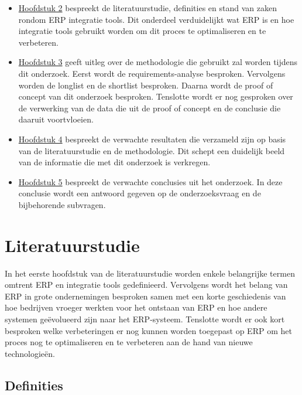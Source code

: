 \begin{itemize}
  \item \hyperref[sec:literatuurstudie]{Hoofdstuk 2} bespreekt de literatuurstudie, definities en stand van zaken rondom ERP integratie tools. Dit onderdeel verduidelijkt wat ERP is en hoe integratie tools gebruikt worden om dit proces te optimaliseren en te verbeteren.
  \item \hyperref[sec:methodologie]{Hoofdstuk 3} geeft uitleg over de methodologie die gebruikt zal worden tijdens dit onderzoek. Eerst wordt de requirements-analyse besproken. Vervolgens worden de longlist en de shortlist besproken. Daarna wordt de proof of concept van dit onderzoek besproken. Tenslotte wordt er nog gesproken over de verwerking van de data die uit de proof of concept en de conclusie die daaruit voortvloeien.
  \item \hyperref[sec:Verwachte resultaten]{Hoofdstuk 4} bespreekt de verwachte resultaten die verzameld zijn op basis van de literatuurstudie en de methodologie. Dit schept een duidelijk beeld van de informatie die met dit onderzoek is verkregen.
  \item \hyperref[sec:discussie-conclusie]{Hoofdstuk 5} bespreekt de verwachte conclusies uit het onderzoek. In deze conclusie wordt een antwoord gegeven op de onderzoeksvraag en de bijbehorende subvragen.
  
\end{itemize}

\section{Literatuurstudie}%
\label{sec:literatuurstudie}

In het eerste hoofdstuk van de literatuurstudie worden enkele belangrijke termen omtrent ERP en integratie tools gedefinieerd. Vervolgens wordt het belang van ERP in grote ondernemingen besproken samen met een korte geschiedenis van hoe bedrijven vroeger werkten voor het ontstaan van ERP en hoe andere systemen geëvolueerd zijn naar het ERP-systeem. Tenslotte wordt er ook kort besproken welke verbeteringen er nog kunnen worden toegepast op ERP om het proces nog te optimaliseren en te verbeteren aan de hand van nieuwe technologieën.

\subsection{Definities}
\label{sec:Definities}

